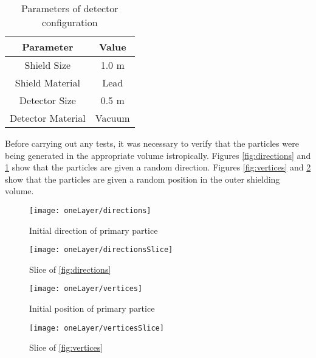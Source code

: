 \documentclass[12pt]{article}
\begin{document}
\begin{table}[H]
  \caption{Parameters of detector configuration}
  \centering
  \begin{tabular}{c c}
  \hline\hline
  Parameter         & Value  \\
  \hline
  Shield Size       & 1.0 m  \\
  Shield Material   & Lead   \\
  Detector Size     & 0.5 m  \\
  Detector Material & Vacuum \\
  \hline
  \end{tabular}
  \label{table:oneLayer}
\end{table}

Before carrying out any tests, it was necessary to verify that the particles were being generated in the appropriate volume istropically. Figures \ref{fig:directions} and \ref{fig:directionsSlice} show that the particles are given a random direction. Figures \ref{fig:vertices} and \ref{fig:verticesSlice} show that the particles are given a random position in the outer shielding volume.

\begin{figure}[H]
  \centering
  \begin{minipage}[t]{0.45\linewidth}
    \texttt{[image: oneLayer/directions]}
    \caption{Initial direction of primary partice}
    \label{fig:directions}
  \end{minipage}
  \quad
  \begin{minipage}[t]{0.45\linewidth}
    \texttt{[image: oneLayer/directionsSlice]}
    \caption{Slice of \ref{fig:directions}}
    \label{fig:directionsSlice}
  \end{minipage}
\end{figure}

\begin{figure}[H]
  \centering
  \begin{minipage}[t]{0.45\linewidth}
    \texttt{[image: oneLayer/vertices]}
    \caption{Initial position of primary partice}
    \label{fig:vertices}
  \end{minipage}
  \quad
  \begin{minipage}[t]{0.45\linewidth}
    \texttt{[image: oneLayer/verticesSlice]}
    \caption{Slice of \ref{fig:vertices}}
    \label{fig:verticesSlice}
  \end{minipage}
\end{figure}
\end{document}
